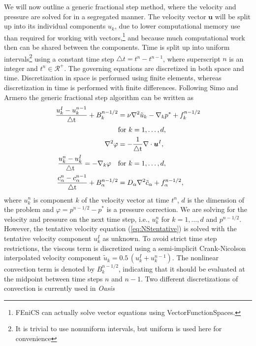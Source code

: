\documentclass[final,3p,times,twocolumn]{elsarticle}
\newcounter{bla}
\begin{document}
We will now outline a generic fractional step method, where the velocity and pressure are solved for in a segregated manner. The velocity vector $\bm{u}$ will be split up into its individual components $u_k$, due to lower computational memory use than required for working with vectors,\footnote{FEniCS can actually solve vector equations using VectorFunctionSpaces.} and because much computational work then can be shared between the components. Time is split up into uniform intervals\footnote{It is trivial to use nonuniform intervals, but uniform is used here for convenience} using a constant time step $\triangle t = t^n-t^{n-1}$, where superscript $n$ is an integer and $t^n \in \mathcal{R}^+$. The governing equations are discretized in both space and time. Discretization in space is performed using finite elements, whereas discretization in time is performed with finite differences.  Following Simo and Armero \cite{simo94} the generic fractional step algorithm can be written as
\begin{align}
\frac{u_k^I - {u}_k^{n-1}}{\triangle \text{t}} + B_k^{n-1/2} &= \nu \nabla^2 \tilde{{u}}_k - \nabla_k p^{*} + {f}_k^{n-1/2} \notag \\
&\text{for} \,\, k=1, \ldots, d,
  \label{eq:NStentative} \\
 \nabla^2 \varphi &= - \frac{1}{\triangle \text{t}} \nabla \cdot \bm{u}^I, \label{eq:pressure} \\
\frac{{u}_k^n - {u}_k^{I}}{\triangle \text{t}} =  - \nabla_k \varphi \quad &\text{for} \,\, k=1, \ldots, d \label{eq:correction}, \\
\frac{c_{\alpha}^n - c_{\alpha}^{n-1}}{\triangle \text{t}} + B_{\alpha}^{n-1/2} &= D_{\alpha} \nabla^2 \tilde{c}_{\alpha} + f_{\alpha}^{n-1/2}, \label{eq:scalar_disc}
\end{align}
where $u_k^n$ is component $k$ of the velocity vector at time $t^n$, $d$ is the dimension of the problem and $ \varphi = p^{n-1/2}-p^{*}$ is a pressure correction. We are solving for the velocity and pressure on the next time step, i.e., $u_k^n$ for $k=1,\ldots, d$ and $p^{n-1/2}$. However, the tentative velocity equation (\ref{eq:NStentative}) is solved with the tentative velocity component $u_k^I$ as unknown. To avoid strict time step restrictions, the viscous term is discretized using a semi-implicit Crank-Nicolson interpolated velocity component $\tilde{u}_k = 0.5\,({u}_k^I+{u}_k^{n-1})$. The nonlinear convection term is denoted by $B_k^{n-1/2}$, indicating that it should be evaluated at the midpoint between time steps $n$ and $n-1$. Two different discretizations of convection is currently used in \emph{Oasis}
\end{document}
